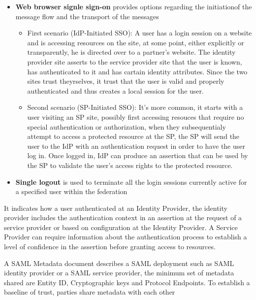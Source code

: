 \begin{itemize}
    \item \textbf{Web browser signle sign-on} provides options regarding the initiationof the message flow and the transport of the messages
    \begin{itemize}
        \item First scenario (IdP-Initiated SSO): A user has a login session on a website and is accessing resources on the site, at some point, either explicitly or transparently, he is directed over to a partner's website. The identity provider site asserts to the service provider site that the user is known, has authenticated to it and has cartain identity attributes. Since the two sites trust theyrselves, it trust that the user is valid and properly authenticated and thus creates a local session for the user.
        \item Second scenario (SP-Initiated SSO): It's more common, it starts with a user visiting an SP site, possibly first accessing resouces that require no special authentication or authorization, when they subsequentialy attempt to access a protected resource at the SP, the SP will send the user to the IdP with an authentication request in order to have the user log in. Once logged in, IdP can produce an assertion that can be used by the SP to validate the user's access rights to the protected resource.
    \end{itemize}
    \item \textbf{Single logout} is used to terminate all the login sessions currently active for a specified user within the federation
\end{itemize}

It indicates how a user authenticated at an Identity Provider, the identity provider includes the authentication context in an assertion at the request of a service provider or based on configuration at the Identity Provider. A Service Provider can require information about the authentication process to establish a level of confidence in the assertion before granting access to resources.

A SAML Metadata document describes a SAML deployment such as SAML identity provider or a SAML service provider, the minimum set of metadata shared are Entity ID, Cryptographic keys and Protocol Endpoints. To establish a baseline of trust, parties share metadata with each other

